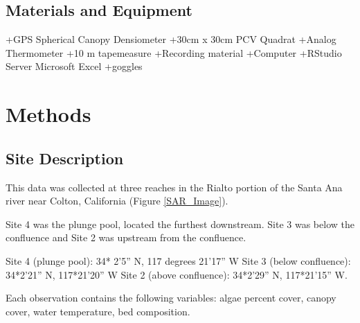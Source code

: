 \documentclass{article}\usepackage[]{graphicx}\usepackage[]{color}
\begin{document}
\subsection{Materials and Equipment} 
+GPS Spherical Canopy Densiometer +30cm x 30cm PCV Quadrat +Analog Thermometer +10 m tapemeasure +Recording material +Computer +RStudio Server Microsoft Excel +goggles 



\section{Methods}


\subsection{Site Description}

This data was collected at three reaches in the Rialto portion of the Santa Ana river near Colton, California (Figure \ref{SAR_Image}).

Site 4 was the plunge pool, located the furthest downstream. Site 3 was below the confluence and Site 2 was upstream from the confluence. 


Site 4 (plunge pool): 34* 2’5” N, 117 degrees 21’17” W 
Site 3 (below conﬂuence): 34*2’21” N, 117*21’20” W 
Site 2 (above conﬂuence): 34*2’29” N, 117*21’15” W. 

Each observation contains the following variables: algae percent cover, canopy cover, water temperature, bed composition.  
\end{document}
